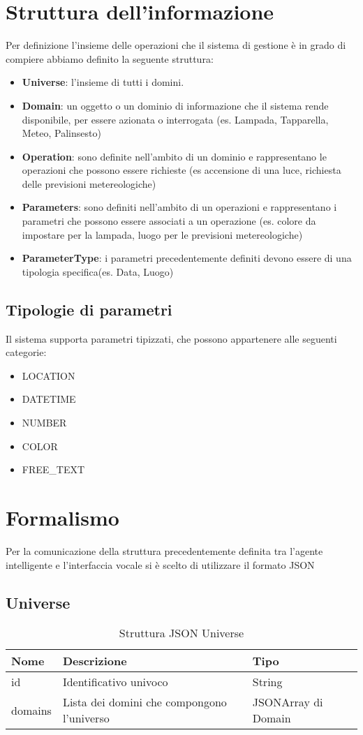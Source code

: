 \documentclass[twoside]{supsistudent}
\begin{document}
\section{Struttura dell'informazione}
Per definizione l'insieme delle operazioni che il sistema di gestione è in grado di compiere abbiamo definito la seguente struttura:
\begin{itemize}
	\item \textbf{Universe}: l'insieme di tutti i domini.
	\item \textbf{Domain}: un oggetto o un dominio di informazione che il sistema rende disponibile, per essere azionata o interrogata (es. Lampada, Tapparella, Meteo, Palinsesto)
	\item \textbf{Operation}: sono definite nell'ambito di un dominio e rappresentano le operazioni che possono essere richieste (es accensione di una luce, richiesta delle previsioni metereologiche)
	\item \textbf{Parameters}: sono definiti nell'ambito di un operazioni e rappresentano i parametri che possono essere associati a un operazione (es. colore da impostare per la lampada, luogo per le previsioni metereologiche)
	\item \textbf{ParameterType}: i parametri precedentemente definiti devono essere di una tipologia specifica(es. Data, Luogo)
\end{itemize}
\subsection{Tipologie di parametri}
Il sistema supporta parametri tipizzati, che possono appartenere alle seguenti categorie:
\begin{itemize}
	\item LOCATION
	\item DATETIME
	\item NUMBER
	\item COLOR
	\item FREE\_TEXT
\end{itemize}
\section{Formalismo}
Per la comunicazione della struttura precedentemente definita tra l'agente intelligente e l'interfaccia vocale si è scelto di utilizzare il formato JSON

\subsection{Universe}
\begin{table}[H]
\centering
\caption{Struttura JSON Universe}
\label{Struttura JSON Universe}
\begin{tabular}{@{}|l|l|l|@{}}
\toprule
Nome    & Descrizione                                & Tipo                \\ \midrule
id      & Identificativo univoco                     & String             \\ \midrule
domains & Lista dei domini che compongono l'universo & JSONArray di Domain \\ \bottomrule
\end{tabular}
\end{table}
\end{document}
